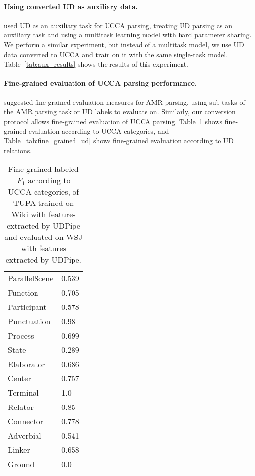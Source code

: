 \documentclass[11pt,a4paper]{article}
\begin{document}
\paragraph{Using converted UD as auxiliary data.}

 used UD as an auxiliary task for UCCA parsing,
treating UD parsing as an auxiliary task and using a multitask learning model
with hard parameter sharing.
We perform a similar experiment, but instead of a multitask model,
we use UD data converted to UCCA and train on it with the same single-task model.
Table~\ref{tab:aux_results} shows the results of this experiment.

\paragraph{Fine-grained evaluation of UCCA parsing performance.}

 suggested fine-grained evaluation measures
for AMR parsing, using sub-tasks of the AMR parsing task or UD labels to evaluate on.
Similarly, our conversion protocol allows fine-grained evaluation of UCCA parsing.
Table~\ref{tab:fine_grained_ucca} shows fine-grained evaluation according to UCCA categories, and
Table~\ref{tab:fine_grained_ud} shows fine-grained evaluation according to UD relations.


\begin{table}[t]
\centering
\small
\setlength\tabcolsep{3pt}
\begin{tabular}{l|l}
ParallelScene & 0.539 \\ 
Function & 0.705 \\ 
Participant & 0.578 \\ 
Punctuation & 0.98 \\ 
Process & 0.699 \\ 
State & 0.289 \\ 
Elaborator & 0.686 \\ 
Center & 0.757 \\ 
Terminal & 1.0 \\ 
Relator & 0.85 \\ 
Connector & 0.778 \\ 
Adverbial & 0.541 \\ 
Linker & 0.658 \\ 
Ground & 0.0
\end{tabular}
\caption{
Fine-grained labeled $F_1$ according to UCCA categories,
of TUPA trained on Wiki with features extracted by UDPipe
and evaluated on WSJ with features extracted by UDPipe.}
\label{tab:fine_grained_ucca}
\end{table}
\end{document}
